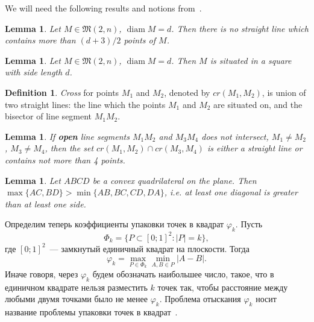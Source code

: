 \documentclass[a4paper,14pt]{article} %
\theoremstyle{plain}
\newtheorem{lemma}[theorem]{Lemma}
\theoremstyle{definition}
\newtheorem{definition}[theorem]{Definition}
\begin{document}
We will need the following results and notions from~\cite{our-vmmsh-2018}.

\begin{lemma}
	\cite[Corollary 1]{our-vmmsh-2018}
	\label{lem:max_points_on_line}
	Let $M\in\mathfrak{M}(2,n)$, $\operatorname{diam} M = d$.
	Then there is no straight line which contains more than $(d+3)/2$ points of $M$.
\end{lemma}

\begin{lemma}
	\cite[Lemma 4]{our-vmmsh-2018}
	\label{lem:square_container}
	Let $M\in\mathfrak{M}(2,n)$, $\operatorname{diam} M = d$.
	Then $M$ is situated in a square with side length $d$.
\end{lemma}

\begin{definition}
	\textit{Cross} for points $M_1$ and $M_2$, denoted by $cr(M_1,M_2)$, is union of two straight lines:
	the line which the points $M_1$ and $M_2$ are situated on,
	and the bisector of line segment $M_1 M_2$.
\end{definition}

\begin{lemma}
	\label{lem:intervals_cross}
	If \textbf{open} line segments $M_1 M_2$ and $M_3 M_4$ does not intersect,
	$M_1 \neq M_2$, $M_3 \neq M_4$,
	then the set $cr(M_1,M_2) \cap cr(M_3,M_4)$ is either a straight line or contains not more than 4 points.
\end{lemma}

\begin{lemma}
	\label{lemma:quadr_diag_edges}
	Let $ABCD$ be a convex quadrilateral on the plane.
	Then $\max\{AC,BD\}>\min\{AB,BC,CD,DA\}$,
	i.e. at least one diagonal is greater than at least one side.
\end{lemma}


Определим теперь коэффициенты упаковки точек в квадрат $\varphi_k$.
Пусть
\begin{equation*}
	\Phi_k = \{ P \subset [0;1]^2 : |P|=k\}
	,
\end{equation*}
где $[0;1]^2$~--- замкнутый единичный квадрат на плоскости.
Тогда
\begin{equation*}
	\varphi_k = \max_{P \in \Phi_k} \min_{A,B \in P} |A - B|
	.
\end{equation*}
Иначе говоря, через $\varphi_k$ будем обозначать наибольшее число, такое,
что в единичном квадрате нельзя разместить $k$ точек так,
чтобы расстояние между любыми двумя точками было не менее $\varphi_k$.
Проблема отыскания $\varphi_k$ носит название проблемы упаковки точек в квадрат~\cite{locatelli2002packing,costa2013valid}.
\end{document}
